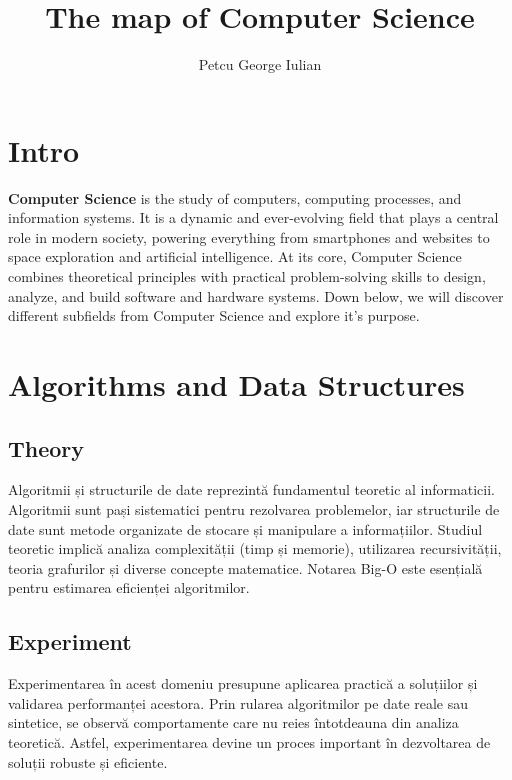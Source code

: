 \documentclass[12pt, letterpaper]{article}
\title{The map of Computer Science}
\author{Petcu George Iulian}
\begin{document}
\maketitle
\tableofcontents



\section{Intro}


\textbf{Computer Science} is the study of computers, computing processes, and information systems. It is a dynamic and ever-evolving field that plays a central role in modern society, powering everything from smartphones and websites to space exploration and artificial intelligence. At its core, Computer Science combines theoretical principles with practical problem-solving skills to design, analyze, and build software and hardware systems.
Down below, we will discover different subfields from Computer Science and explore it's purpose.


\section{Algorithms and Data Structures}

\subsection*{Theory}
Algoritmii și structurile de date reprezintă fundamentul teoretic al informaticii. Algoritmii sunt pași sistematici pentru rezolvarea problemelor, iar structurile de date sunt metode organizate de stocare și manipulare a informațiilor. Studiul teoretic implică analiza complexității (timp și memorie), utilizarea recursivității, teoria grafurilor și diverse concepte matematice. Notarea Big-O este esențială pentru estimarea eficienței algoritmilor.

\subsection*{Experiment}
Experimentarea în acest domeniu presupune aplicarea practică a soluțiilor și validarea performanței acestora. Prin rularea algoritmilor pe date reale sau sintetice, se observă comportamente care nu reies întotdeauna din analiza teoretică. Astfel, experimentarea devine un proces important în dezvoltarea de soluții robuste și eficiente.
\end{document}
